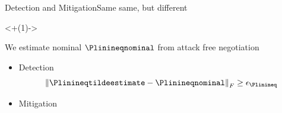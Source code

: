 \documentclass[handout,aspectratio=169]{beamer}
\begin{document}
\begin{frame}{Detection and Mitigation}{Same same, but different}

  \onslide<+(1)->{
    \begin{assumption}
      We estimate nominal $\Plinineqnominal$ from attack free negotiation
    \end{assumption}
  }

  \begin{itemize}[<+(1)->]
    \item Detection
          \begin{equation*}
            \norm{\Plinineqtildeestimate-\Plinineqnominal}_{F} \geq\epsilon_{\Plinineq}
          \end{equation*}
    \item Mitigation
  \end{itemize}
\end{frame}
\end{document}
